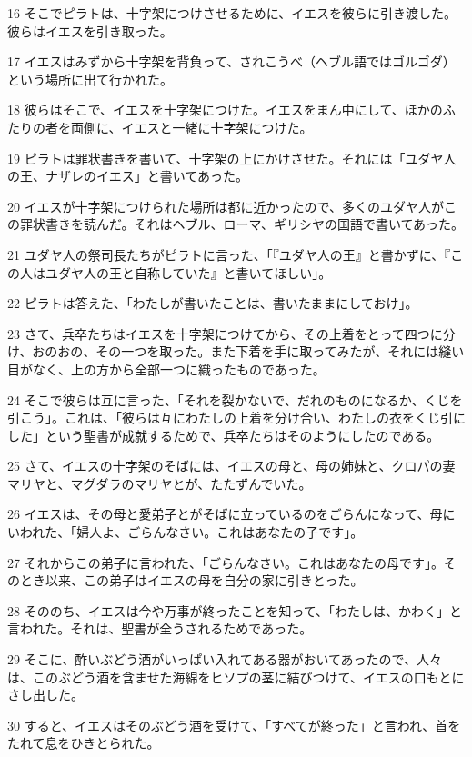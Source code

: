 \par 16 そこでピラトは、十字架につけさせるために、イエスを彼らに引き渡した。彼らはイエスを引き取った。
\par 17 イエスはみずから十字架を背負って、されこうべ（ヘブル語ではゴルゴダ）という場所に出て行かれた。
\par 18 彼らはそこで、イエスを十字架につけた。イエスをまん中にして、ほかのふたりの者を両側に、イエスと一緒に十字架につけた。
\par 19 ピラトは罪状書きを書いて、十字架の上にかけさせた。それには「ユダヤ人の王、ナザレのイエス」と書いてあった。
\par 20 イエスが十字架につけられた場所は都に近かったので、多くのユダヤ人がこの罪状書きを読んだ。それはヘブル、ローマ、ギリシヤの国語で書いてあった。
\par 21 ユダヤ人の祭司長たちがピラトに言った、「『ユダヤ人の王』と書かずに、『この人はユダヤ人の王と自称していた』と書いてほしい」。
\par 22 ピラトは答えた、「わたしが書いたことは、書いたままにしておけ」。
\par 23 さて、兵卒たちはイエスを十字架につけてから、その上着をとって四つに分け、おのおの、その一つを取った。また下着を手に取ってみたが、それには縫い目がなく、上の方から全部一つに織ったものであった。
\par 24 そこで彼らは互に言った、「それを裂かないで、だれのものになるか、くじを引こう」。これは、「彼らは互にわたしの上着を分け合い、わたしの衣をくじ引にした」という聖書が成就するためで、兵卒たちはそのようにしたのである。
\par 25 さて、イエスの十字架のそばには、イエスの母と、母の姉妹と、クロパの妻マリヤと、マグダラのマリヤとが、たたずんでいた。
\par 26 イエスは、その母と愛弟子とがそばに立っているのをごらんになって、母にいわれた、「婦人よ、ごらんなさい。これはあなたの子です」。
\par 27 それからこの弟子に言われた、「ごらんなさい。これはあなたの母です」。そのとき以来、この弟子はイエスの母を自分の家に引きとった。
\par 28 そののち、イエスは今や万事が終ったことを知って、「わたしは、かわく」と言われた。それは、聖書が全うされるためであった。
\par 29 そこに、酢いぶどう酒がいっぱい入れてある器がおいてあったので、人々は、このぶどう酒を含ませた海綿をヒソプの茎に結びつけて、イエスの口もとにさし出した。
\par 30 すると、イエスはそのぶどう酒を受けて、「すべてが終った」と言われ、首をたれて息をひきとられた。
